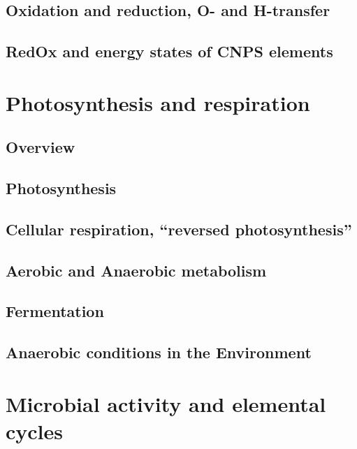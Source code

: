\documentclass{article}
\begin{document}
\subsection{Oxidation and reduction, O- and H-transfer}



\subsection{RedOx and energy states of CNPS elements}



\section{Photosynthesis and respiration}
\subsection{Overview}



\subsection{Photosynthesis}



\subsection{Cellular respiration, ``reversed photosynthesis''}



\subsection{Aerobic and Anaerobic metabolism}



\subsection{Fermentation}



\subsection{Anaerobic conditions in the Environment}



\section{Microbial activity and elemental cycles}
\end{document}
